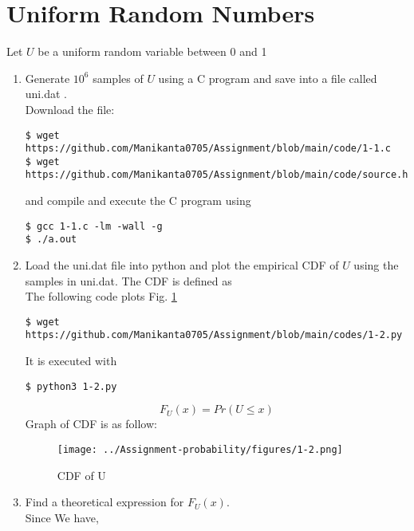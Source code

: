 \documentclass[journal,12pt,twocolumn]{IEEEtran}
\renewcommand\thesection{\arabic{section}}
\begin{document}
\section{Uniform Random Numbers}
Let $U$ be a uniform  random variable between 0 and 1
\begin{enumerate}[label=\thesection.\arabic*.,ref=\thesection.\theenumi]
\item Generate $10^6$ samples of $U$ using a C program and save into a file called uni.dat .\\
\solution Download the file:
\begin{lstlisting}
$ wget https://github.com/Manikanta0705/Assignment/blob/main/code/1-1.c
$ wget https://github.com/Manikanta0705/Assignment/blob/main/code/source.h
\end{lstlisting}
and compile and execute the C program using
\begin{lstlisting}
$ gcc 1-1.c -lm -wall -g
$ ./a.out
\end{lstlisting}
\item Load the uni.dat file into python and plot the empirical CDF of $U$ using the samples in uni.dat. The CDF is defined as\\
\solution  The following code plots Fig. \ref{fig:uni_cdf}
\begin{lstlisting}
$ wget https://github.com/Manikanta0705/Assignment/blob/main/codes/1-2.py
\end{lstlisting}
It is executed with
\begin{lstlisting}
$ python3 1-2.py
\end{lstlisting}
\begin{equation}
         F_U(x) = Pr(U \leq x)
\end{equation}
    Graph of CDF is as follow:
    \begin{figure}[H]
        \centering
  \texttt{[image: ../Assignment-probability/figures/1-2.png]} \label{fig:uni_cdf}
        \caption{CDF of U}
        \end{figure}
\item Find a theoretical expression for $F_U(x)$.\\
\solution Since We have,
    

\end{enumerate}
\end{document}
